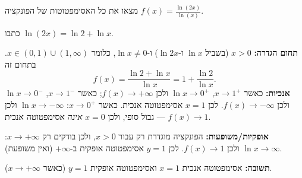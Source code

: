 
\begin{question}
מצאו את כל האסימפטוטות של הפונקציה $f(x)=\frac{\ln(2x)}{\ln(x)}$.
\end{question}

\begin{hint}
כתבו $\ln(2x)=\ln2+\ln x$.
\end{hint}

\begin{solution}
\textbf{תחום הגדרה:} $x>0$ (בשביל $\ln x$ ו-$\ln 2x$) ו-$\ln x\neq0$, כלומר $x\in(0,1)\cup(1,\infty)$. בתחום זה
\[
f(x)=\frac{\ln2+\ln x}{\ln x}=1+\frac{\ln2}{\ln x}.
\]
\textbf{אנכיות:} כאשר $x\to1^+$, $\ln x\to0^+$ ולכן $f(x)\to+\infty$; כאשר $x\to1^-$, $\ln x\to0^-$ ולכן $f(x)\to-\infty$. לכן $x=1$ אסימפטוטה אנכית.
כאשר $x\to0^+$: $\ln x\to-\infty$ ולכן $f(x)\to1$ — גבול סופי, ולכן $x=0$ \emph{אינה} אסימפטוטה אנכית.

\textbf{אופקיות/משופעות:} הפונקציה מוגדרת רק עבור $x>0$, ולכן בודקים רק $x\to+\infty$: $\ln x\to\infty$ ולכן $f(x)\to1$. לכן $y=1$ אסימפטוטה אופקית ב-$+\infty$ (ואין משופעת).

\textbf{תשובה:} אסימפטוטה אנכית $x=1$ ואסימפטוטה אופקית $y=1$ (כאשר $x\to+\infty$).
\end{solution}
